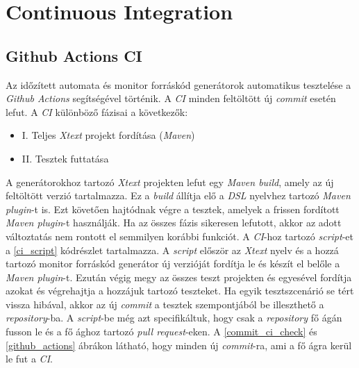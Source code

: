 \clearpage\section{Continuous Integration}\subsection{Github Actions CI}

Az időzített automata és monitor forráskód generátorok automatikus tesztelése a \textit{Github Actions} segítségével történik.
A \textit{CI} minden feltöltött új \textit{commit} esetén lefut.
A \textit{CI} különböző fázisai a következők:

\begin{itemize}
    \item I. Teljes \textit{Xtext} projekt fordítása (\textit{Maven})
    \item II. Tesztek futtatása
\end{itemize}

A generátorokhoz tartozó \textit{Xtext} projekten lefut egy \textit{Maven build}, amely az új feltöltött verzió tartalmazza.
Ez a \textit{build} állítja elő a \textit{DSL} nyelvhez tartozó \textit{Maven plugin}-t is.
Ezt követően hajtódnak végre a tesztek, amelyek a frissen fordított \textit{Maven plugin}-t használják.
Ha az összes fázis sikeresen lefutott, akkor az adott változtatás nem rontott el semmilyen korábbi funkciót.
A \textit{CI}-hoz tartozó \textit{script}-et a \ref{ci_script} kódrészlet tartalmazza.
A \textit{script} először az \textit{Xtext} nyelv és a hozzá tartozó monitor forráskód generátor új verzióját fordítja le és készít el belőle a \textit{Maven plugin}-t.
Ezután végig megy az összes teszt projekten és egyesével fordítja azokat és végrehajtja a hozzájuk tartozó teszteket.
Ha egyik tesztszcenárió se tért vissza hibával, akkor az új \textit{commit} a tesztek szempontjából be illeszthető a \textit{repository}-ba.
A \textit{script}-be még azt specifikáltuk, hogy csak a \textit{repository} fő ágán fusson le és a fő ághoz tartozó \textit{pull request}-eken.
A \ref{commit_ci_check} és \ref{github_actions} ábrákon látható, hogy minden új \textit{commit}-ra, ami a fő ágra kerül le fut a \textit{CI}.

